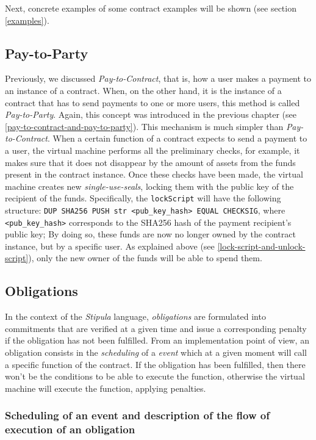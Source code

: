 Next, concrete examples of some contract examples will be shown (see section \ref{examples}). 

\subsection{Pay-to-Party}

Previously, we discussed \textit{Pay-to-Contract}, that is, how a user makes a payment to an instance of 
a contract. When, on the other hand, it is the instance of a contract that has to send payments to one or 
more users, this method is called \textit{Pay-to-Party}. Again, this concept was introduced in the 
previous chapter (see \ref{pay-to-contract-and-pay-to-party}). This mechanism is much simpler than 
\textit{Pay-to-Contract}. When a certain function of a contract expects to send a payment to a user, the 
virtual machine performs all the preliminary checks, for example, it makes sure that it does not disappear 
by the amount of assets from the funds present in the contract instance. Once these checks have been made, 
the virtual machine creates new \textit{single-use-seals}, locking them with the public key of the 
recipient of the funds. Specifically, the \verb|lockScript| will have the following structure: 
\verb|DUP SHA256 PUSH str <pub_key_hash> EQUAL CHECKSIG|, where \verb|<pub_key_hash>| corresponds to the 
SHA256 hash of the payment recipient's public key; By doing so, these funds are now no longer owned by 
the contract instance, but by a specific user. As explained above (see 
\ref{lock-script-and-unlock-script}), only the new owner of the funds will be able to spend them.

\subsection{Obligations}

In the context of the \textit{Stipula} language, \textit{obligations} are formulated into commitments that 
are verified at a given time and issue a corresponding penalty if the obligation has not been fulfilled. 
From an implementation point of view, an obligation consists in the \textit{scheduling} of a 
\textit{event} which at a given moment will call a specific function of the contract. If the obligation 
has been fulfilled, then there won't be the conditions to be able to execute the function, otherwise the 
virtual machine will execute the function, applying penalties.

\subsubsection{Scheduling of an event and description of the flow of execution of an obligation}
\label{execution-flow-for-obligation}

